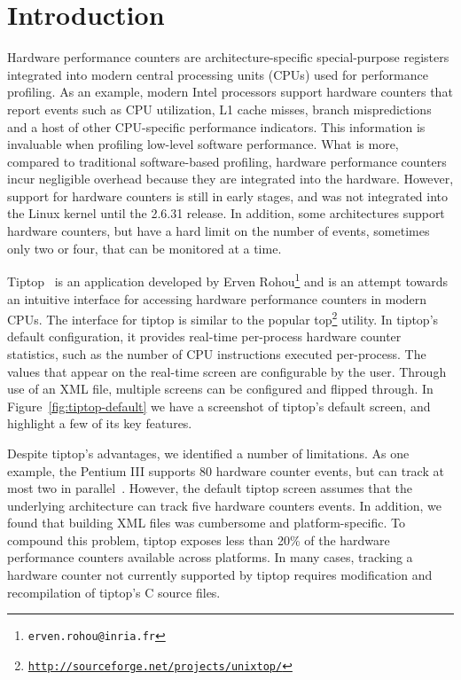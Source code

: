 \section{Introduction}
Hardware performance counters are architecture-specific special-purpose registers integrated into modern central processing units (CPUs) used for performance profiling.
As an example, modern Intel processors support hardware counters that report events such as CPU utilization, L1 cache misses, branch mispredictions and a host of other CPU-specific performance indicators.
This information is invaluable when profiling low-level software performance.
What is more, compared to traditional software-based profiling, hardware performance counters incur negligible overhead because they are integrated into the hardware.
However, support for hardware counters is still in early stages, and was not integrated into the Linux kernel until the 2.6.31 release.
In addition, some architectures support hardware counters, but have a hard limit on the number of events, sometimes only two or four, that can be monitored at a time.

Tiptop~\cite{rohou:hal-00639173} is an application developed by Erven Rohou\footnote{\texttt{erven.rohou@inria.fr}} and is an attempt towards an intuitive interface for accessing hardware performance counters in modern CPUs.
The interface for tiptop is similar to the popular top\footnote{\texttt{\url{http://sourceforge.net/projects/unixtop/}}} utility. 
In tiptop's default configuration, it provides real-time per-process hardware counter statistics, such as the number of CPU instructions executed per-process.
The values that appear on the real-time screen are configurable by the user.
Through use of an XML file, multiple screens can be configured and flipped through.
In Figure~\ref{fig:tiptop-default} we have a screenshot of tiptop's default screen, and highlight a few of its key features.

Despite tiptop's advantages, we identified a number of limitations.
As one example, the Pentium III supports 80 hardware counter events, but can track at most two in parallel~\cite{hpc-trusted}.
However, the default tiptop screen assumes that the underlying architecture can track five hardware counters events.
In addition, we found that building XML files was cumbersome and platform-specific.
To compound this problem, tiptop exposes less than 20\% of the hardware performance counters available across platforms.
In many cases, tracking a hardware counter not currently supported by tiptop requires modification and recompilation of tiptop's C source files.

